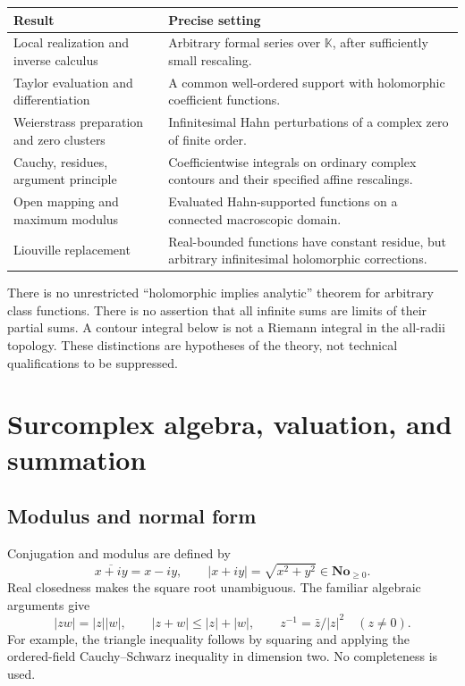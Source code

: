 \documentclass[11pt,oneside]{article}
\theoremstyle{definition}\newtheorem{definition}[theorem]{Definition}
\newcommand{\No}{\mathbf{No}}
\newcommand{\K}{\mathbb K}
\begin{document}
\begin{center}
\begin{tabular}{>{\raggedright\arraybackslash}p{}>{\raggedright\arraybackslash}p{}}
\toprule
Result & Precise setting \\
\midrule
Local realization and inverse calculus & Arbitrary formal series over $\K$, after sufficiently small rescaling.\\
Taylor evaluation and differentiation & A common well-ordered support with holomorphic coefficient functions.\\
Weierstrass preparation and zero clusters & Infinitesimal Hahn perturbations of a complex zero of finite order.\\
Cauchy, residues, argument principle & Coefficientwise integrals on ordinary complex contours and their specified affine rescalings.\\
Open mapping and maximum modulus & Evaluated Hahn-supported functions on a connected macroscopic domain.\\
Liouville replacement & Real-bounded functions have constant residue, but arbitrary infinitesimal holomorphic corrections.\\
\bottomrule
\end{tabular}
\end{center}
There is no unrestricted ``holomorphic implies analytic'' theorem for arbitrary class functions. There is no assertion that all infinite sums are limits of their partial sums. A contour integral below is not a Riemann integral in the all-radii topology. These distinctions are hypotheses of the theory, not technical qualifications to be suppressed.

\section{Surcomplex algebra, valuation, and summation}\label{sec:foundations}
\subsection{Modulus and normal form}
Conjugation and modulus are defined by
\[
 \overline{x+iy}=x-iy,\qquad |x+iy|=\sqrt{x^2+y^2}\in\No_{\geq0}.
\]
Real closedness makes the square root unambiguous. The familiar algebraic arguments give
\[
 |zw|=|z||w|,\qquad |z+w|\leq |z|+|w|,\qquad
 z^{-1}=\bar z/|z|^2\quad(z\ne0).
\]
For example, the triangle inequality follows by squaring and applying the ordered-field Cauchy--Schwarz inequality in dimension two. No completeness is used.
\end{document}
